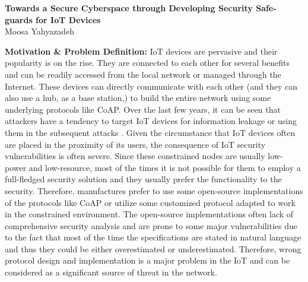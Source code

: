 \documentclass[10pt,onecolumn]{article}
\date{}
\newcommand{\ProposalTitle}{Towards a Secure Cyberspace through Developing Security Safe-guards for IoT Devices}
\begin{document}
\pagestyle{empty}

\sloppypar
\begin{center}
{\large  \bf \ProposalTitle} 
\\
\vspace{3pt} {Moosa Yahyazadeh}\\
\end{center}

\noindent\textbf{Motivation \& Problem Definition:} 
IoT devices are pervasive and their popularity is on the rise. They are connected to each other for several benefits and can be readily accessed from the local network or managed through the Internet. These devices can directly communicate with each other (and they can also use a hub, as a base station,) to build the entire network using some underlying protocols like CoAP. Over the last few years, it can be seen that attackers have a tendency to target IoT devices for information leakage \cite{OsramSmartBulbs}\cite{BabyMonitors} or using them in the subsequent attacks \cite{ChineseDDoS}. Given the circumstance that IoT devices often are placed in the proximity of its users, the consequence of IoT security vulnerabilities is often severe. Since these constrained nodes are usually low-power and low-resource, most of the times it is not possible for them to employ a full-fledged security solution and they usually prefer the functionality to the security. Therefore, manufactures prefer to use some open-source implementations of the protocols like CoAP or utilize some customized protocol adapted to work in the constrained environment. The open-source implementations often lack of comprehensive security analysis and are prone to some major vulnerabilities due to the fact that most of the time the specifications are stated in natural language and thus they could be either overestimated or underestimated. Therefore, wrong protocol design and implementation is a major problem in the IoT and can be considered as a significant source of threat in the network.
\end{document}
